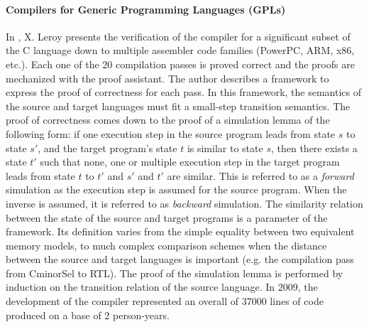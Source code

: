 \documentclass[pdflatex,sn-mathphys]{sn-jnl}%
\theoremstyle{thmstyleone}%
\theoremstyle{thmstyletwo}%
\theoremstyle{thmstylethree}%
\begin{document}
\paragraph{Compilers for Generic Programming Languages (GPLs)}

In \cite{Leroy2009}, X. Leroy presents the verification of the
\ccert{} compiler for a significant subset of the C language down to
multiple assembler code families (PowerPC, ARM, x86, etc.). Each one
of the 20 compilation passes is proved correct and the proofs are
mechanized with the \coq{} proof assistant. The author describes a
framework to express the proof of correctness for each pass. In this
framework, the semantics of the source and target languages must fit a
small-step transition semantics. The proof of correctness comes down
to the proof of a simulation lemma of the following form: if one
execution step in the source program leads from state $s$ to state
$s'$, and the target program's state $t$ is similar to state $s$, then
there exists a state $t'$ such that none, one or multiple execution
step in the target program leads from state $t$ to $t'$ and $s'$ and
$t'$ are similar. This is referred to as a \textit{forward} simulation
as the execution step is assumed for the source program. When the
inverse is assumed, it is referred to as \textit{backward}
simulation. The similarity relation between the state of the source
and target programs is a parameter of the framework. Its definition
varies from the simple equality between two equivalent memory models,
to much complex comparison schemes when the distance between the
source and target languages is important (e.g. the compilation pass
from \textsf{CminorSel} to RTL). The proof of the simulation lemma is
performed by induction on the transition relation of the source
language. In 2009, the development of the \ccert{} compiler
represented an overall of 37000 lines of \coq{} code produced on a
base of 2 person-years.
\end{document}
